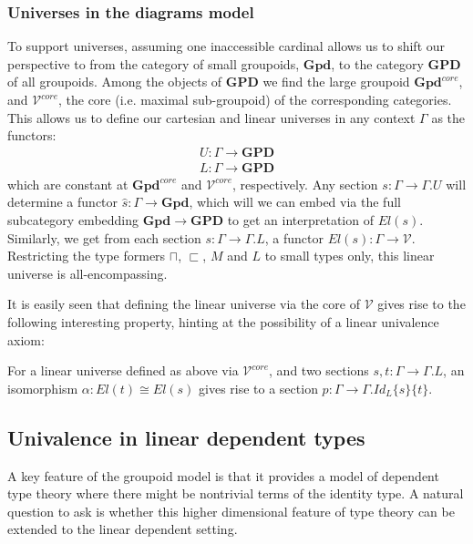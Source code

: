 \subsubsection{Universes in the diagrams model}
To support universes, assuming one inaccessible cardinal allows us to shift our perspective to from the category of small groupoids, $\mathbf{Gpd}$, to the category $\mathbf{GPD}$ of all groupoids. Among the objects of $\mathbf{GPD}$ we find the large groupoid $\mathbf{Gpd}^{core}$, and $\mathcal{V}^{core}$, the core (i.e. maximal sub-groupoid) of the corresponding categories. This allows us to define our cartesian and linear universes in any context $\Gamma$ as the functors:
\[
  \begin{split}
    U :  \Gamma \to \mathbf{GPD}\\
    L : \Gamma \to \mathbf{GPD}
  \end{split}
\]
which are constant at $\mathbf{Gpd}^{core}$ and $\mathcal{V}^{core}$, respectively. Any section $s : \Gamma \to \Gamma.U$ will determine a functor $\hat s : \Gamma \to \mathbf{Gpd}$, which will we can embed via the full subcategory embedding $\mathbf{Gpd} \to \mathbf{GPD}$ to get an interpretation of $El(s)$. Similarly, we get from each section $s : \Gamma \to \Gamma.L$, a functor $El(s) : \Gamma \to \mathcal{V}$. Restricting the type formers $\sqcap$, $\sqsubset$, $M$ and $L$ to small types only, this linear universe is all-encompassing.


It is easily seen that defining the linear universe via the core of $\mathcal{V}$ gives rise to the following interesting property, hinting at the possibility of a linear univalence axiom:
\begin{corl}For a linear universe defined as above via $\mathcal{V}^{core}$, and two sections $s, t : \Gamma \to \Gamma.L$, an isomorphism $\alpha : El(t) \cong El(s)$ gives rise to a section $p : \Gamma \to \Gamma.Id_L\{s\}\{t\}$.
\end{corl}
\subsection{Univalence in linear dependent types}\label{highermodel}
A key feature of the groupoid model is that it provides a model of dependent type theory where there might be nontrivial terms of the identity type. A natural question to ask is whether this higher dimensional feature of type theory can be extended to the linear dependent setting.


